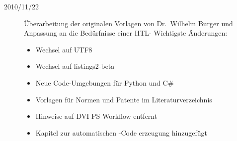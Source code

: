 \begin{sloppypar}
\begin{description}
\item[2010/11/22]
Überarbeitung der originalen Vorlagen von Dr.\ Wilhelm Burger und Anpassung an
die Bedürfnisse einer HTL-
Wichtigste Änderungen:
\begin{itemize}
  \item Wechsel auf UTF8
  \item Wechsel auf listings2-beta
  \item Neue Code-Umgebungen für Python und C\#
  \item Vorlagen für Normen und Patente im Literaturverzeichnis
  \item Hinweise auf DVI-PS Workflow entfernt
  \item Kapitel zur automatischen \latex-Code erzeugung hinzugefügt
\end{itemize}
%
\end{description}

\end{sloppypar}




